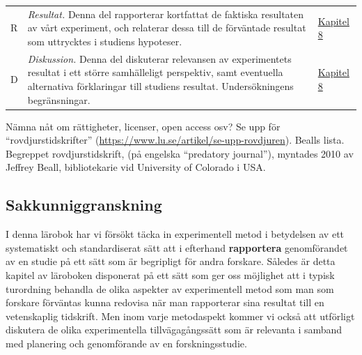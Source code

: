 \documentclass[
]{book}
\begin{document}
\begin{longtable}[]{@{}lll@{}}
\begin{minipage}[t]{0.05\columnwidth}\raggedright
R\strut
\end{minipage} & \begin{minipage}[t]{0.78\columnwidth}\raggedright
\emph{Resultat.} Denna del rapporterar kortfattat de faktiska resultaten av vårt experiment, och relaterar dessa till de förväntade resultat som uttrycktes i studiens hypoteser.\strut
\end{minipage} & \begin{minipage}[t]{0.08\columnwidth}\raggedright
\protect\hyperlink{chap08}{Kapitel 8}\strut
\end{minipage}\tabularnewline
\begin{minipage}[t]{0.05\columnwidth}\raggedright
D\strut
\end{minipage} & \begin{minipage}[t]{0.78\columnwidth}\raggedright
\emph{Diskussion.} Denna del diskuterar relevansen av experimentets resultat i ett större samhälleligt perspektiv, samt eventuella alternativa förklaringar till studiens resultat. Undersökningens begränsningar.\strut
\end{minipage} & \begin{minipage}[t]{0.08\columnwidth}\raggedright
\protect\hyperlink{chap08}{Kapitel 8}\strut
\end{minipage}\tabularnewline
\bottomrule
\end{longtable}

Nämna nåt om rättigheter, licenser, open access osv? Se upp för ``rovdjurstidskrifter'' (\url{https://www.lu.se/artikel/se-upp-rovdjuren}). Bealls lista. Begreppet rovdjurstidskrift, (på engelska ``predatory journal''), myntades 2010 av ­Jeffrey ­Beall, bibliotekarie vid University of Colorado i USA.

\hypertarget{sub08.3.3}{%
\subsection{Sakkunniggranskning}\label{sub08.3.3}}

I denna lärobok har vi försökt täcka in experimentell metod i betydelsen av ett systematiskt och standardiserat sätt att i efterhand \textbf{rapportera} genomförandet av en studie på ett sätt som är begripligt för andra forskare. Således är detta kapitel av läroboken disponerat på ett sätt som ger oss möjlighet att i typisk turordning behandla de olika aspekter av experimentell metod som man som forskare förväntas kunna redovisa när man rapporterar sina resultat till en vetenskaplig tidskrift. Men inom varje metodaspekt kommer vi också att utförligt diskutera de olika experimentella tillvägagångssätt som är relevanta i samband med planering och genomförande av en forskningsstudie.
\end{document}

